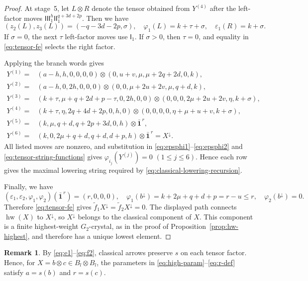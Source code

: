 \documentclass[11pt,reqno]{amsart}
\newcommand{\hw}{\operatorname{hw}}
\numberwithin{table}{section}
\numberwithin{equation}{section}
\theoremstyle{plain}
\theoremstyle{definition}
\newtheorem{remark}[theorem]{Remark}
\begin{document}
\begin{proof}
	At stage~5, let \(L\otimes R\) denote the tensor obtained from
	\(Y^{(4)}\) after the left-factor moves
	\(\mathsf{III}_1^h\mathsf{II}_1^{q+3d+2p}\).
	Then we have
	\[
		(z_2(L),z_3(L))
		=(-q-3d-2p,\sigma),\quad
		\varphi_1(L)=k+\tau+\sigma,\quad
		\varepsilon_1(R)=k+\sigma.
	\]
	If \(\sigma=0\), the next \(\tau\) left-factor moves use
	\(\mathsf I_1\).
	If \(\sigma>0\), then \(\tau=0\), and equality in
	\eqref{eq:tensor-fe} selects the right factor.
	
	Applying the branch words gives
	\begin{equation}\label{eq:classical-lowering-endpoint}
		\begin{aligned}
			Y^{(1)}
			={}&
			(a-h,h,0,0,0,0)
			\otimes
			(0,u+v,\mu,\mu+2q+2d,0,k),
			\\
			Y^{(2)}
			={}&
			(a-h,0,2h,0,0,0)
			\otimes
			(0,0,\mu+2u+2v,\mu,q+d,k),
			\\
			Y^{(3)}
			={}&
			(k+\tau,\mu+q+2d+p-\tau,0,2h,0,0)
			\otimes
			(0,0,0,2\mu+2u+2v,\eta,k+\sigma),
			\\
			Y^{(4)}
			={}&
			(k+\tau,\eta,2q+4d+2p,0,h,0)
			\otimes
			(0,0,0,0,\eta+\mu+u+v,k+\sigma),
			\\
			Y^{(5)}
			={}&
			(k,\mu,q+d,q+2p+3d,0,h)
			\otimes
			\bar{\mathbf1}^{\,r},
			\\
			Y^{(6)}
			={}&
			(k,0,2\mu+q+d,q+d,d+p,h)
			\otimes
			\bar{\mathbf1}^{\,r}
			=
			X^\downarrow.
		\end{aligned}
	\end{equation}
	All listed moves are nonzero, and substitution in
	\eqref{eq:epsphi1}--\eqref{eq:epsphi2} and
	\eqref{eq:tensor-string-functions} gives $\varphi_{i_j}(Y^{(j)})=0$ $(1\le j\le6)$.
	Hence each row gives the maximal lowering string required by
	\eqref{eq:classical-lowering-recursion}.
	
	Finally, we have
	\[
		(\varepsilon_1,\varepsilon_2,\varphi_1,\varphi_2)
		(\bar{\mathbf1}^{\,r})
		=(r,0,0,0),\quad
		\varphi_1(b^\downarrow)
		=k+2\mu+q+d+p=r-u\le r,\quad
		\varphi_2(b^\downarrow)=0.
	\]
	Therefore \eqref{eq:tensor-fe} gives
	\(\widetilde f_1X^\downarrow
	=\widetilde f_2X^\downarrow=0\).
	The displayed path connects \(\hw(X)\) to \(X^\downarrow\),
	so \(X^\downarrow\) belongs to the classical component of \(X\).
	This component is a finite highest-weight \(G_2\)-crystal,
	as in the proof of Proposition~\ref{prop:hw-highest},
	and therefore has a unique lowest element.
\end{proof}

\begin{remark}\label{rem:s-invariance}
	By \eqref{eq:e1}--\eqref{eq:f2}, classical arrows preserve
	\(s\) on each tensor factor.
	Hence, for \(X=b\otimes c\in B_l\otimes B_l\), the parameters
	in \eqref{eq:high-param}--\eqref{eq:r-def} satisfy $a=s(b)$ and $	r=s(c)$.
\end{remark}
\end{document}
